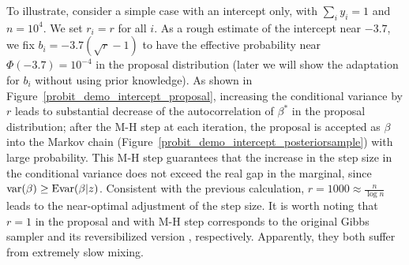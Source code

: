 \documentclass[10pt]{article}
\begin{document}
To illustrate, consider a simple case with an intercept only, with $\sum_i y_i =1$ and $n=10^4$. We set $r_i=r$ for all $i$. As a rough estimate of the intercept near $-3.7$, we fix $b_i = -3.7 (\sqrt r -1)$ to have the effective probability near $\Phi(-3.7)= 10^{-4}$ in the proposal distribution (later we will show the adaptation for $b_i$ without using prior knowledge). As shown in Figure~\ref{probit_demo_intercept_proposal}, increasing the conditional variance by $r$ leads to substantial decrease of the autocorrelation of $\beta^*$ in the proposal distribution; after the M-H step at each iteration, the proposal is accepted as $\beta$ into the Markov chain (Figure~\ref{probit_demo_intercept_posteriorsample}) with large probability. This M-H step guarantees that the increase in the step size in the conditional variance does not exceed the real gap in the marginal, since $\mbox{var}(\beta)\ge \mbox E \mbox{var}(\beta|z)$. Consistent with the previous calculation, $r= 1000\approx \frac{n}{\log n}$ leads to the near-optimal adjustment of the step size. It is worth noting that $r=1$ in the proposal and with M-H step corresponds to the original \cite{albert1993bayesian} Gibbs sampler and its reversibilized version \citep{fill1991eigenvalue}, respectively. Apparently, they both suffer from extremely slow mixing.
\end{document}
